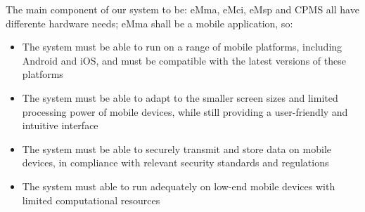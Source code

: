 The main component of our system to be: eMma, eMci, eMsp and CPMS all have differente hardware needs; 
eMma shall be a mobile application, so:
\begin{itemize}
    \item The system must be able to run on a range of mobile platforms, including Android and iOS, and must be compatible with the latest versions of these platforms
    \item The system must be able to adapt to the smaller screen sizes and limited processing power of mobile devices, while still providing a user-friendly and intuitive interface
    \item The system must be able to securely transmit and store data on mobile devices, in compliance with relevant security standards and regulations
    \item The system must able to run adequately on low-end mobile devices with limited computational resources 
\end{itemize}

